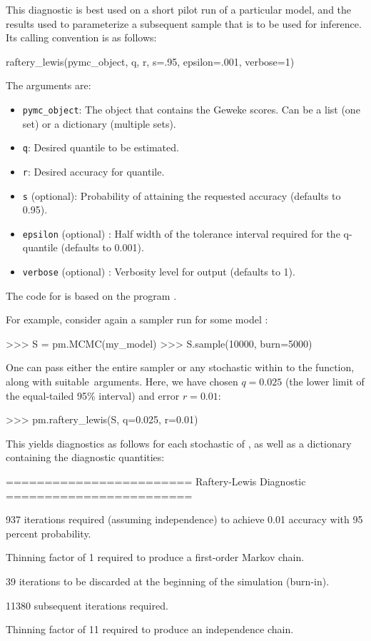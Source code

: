 \documentclass[]{jss}
\begin{document}
This diagnostic is best used on a short pilot run of a particular model, and the results used to parameterize a subsequent sample that is to be used for inference. Its calling convention is as follows:
\begin{CodeInput}
raftery_lewis(pymc_object, q, r, s=.95, epsilon=.001, verbose=1)
\end{CodeInput}
The arguments are:
\begin{itemize}

  \item \verb=pymc_object=: The object that contains the Geweke scores. Can be a list (one set) or a dictionary (multiple sets).

    \item \verb=q=: Desired quantile to be estimated.

    \item \verb=r=: Desired accuracy for quantile.

    \item \verb=s= (optional): Probability of attaining the requested accuracy (defaults to 0.95).

    \item \verb=epsilon= (optional) : Half width of the tolerance interval required for the q-quantile (defaults to 0.001).

    \item \verb=verbose= (optional) : Verbosity level for output (defaults to 1).
\end{itemize}

The code for  is based on the   program  \citep{gibbsit}.

For example, consider again a sampler  run for some model :
\begin{CodeInput}
>>> S = pm.MCMC(my_model)
>>> S.sample(10000, burn=5000)
\end{CodeInput}
One can pass either the entire sampler  or any stochastic within  to the  function, along with suitable~arguments. Here, we have chosen $q=0.025$ (the lower limit of the equal-tailed 95\% interval) and error $r=0.01$:
\begin{CodeInput}
>>> pm.raftery_lewis(S, q=0.025, r=0.01)
\end{CodeInput}
This yields diagnostics as follows for each stochastic of , as well as a dictionary containing the diagnostic quantities:

\begin{CodeInput}
========================
Raftery-Lewis Diagnostic
========================

937 iterations required (assuming independence) to achieve 0.01 accuracy
with 95 percent probability.

Thinning factor of 1 required to produce a first-order Markov chain.

39 iterations to be discarded at the beginning of the simulation (burn-in).

11380 subsequent iterations required.

Thinning factor of 11 required to produce an independence chain.
\end{CodeInput}
\end{document}
